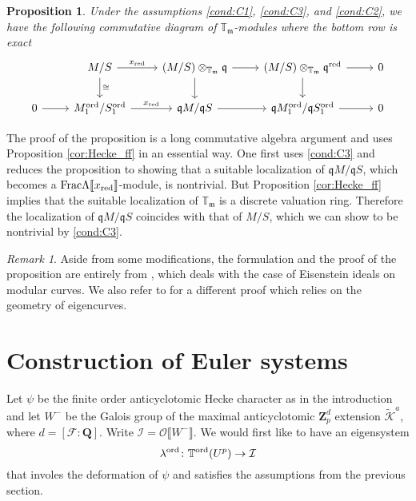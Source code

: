 \documentclass[leqno]{amsart}
\newtheorem{prop}[thm]{Proposition}
\theoremstyle{definition}
\theoremstyle{remark}
\newtheorem{rem}[thm]{Remark}
\newcommand{\oo}{\mathcal{O}}
\newcommand{\Q}{{\mathbf{Q}}}
\newcommand{\Zp}{\mathbf{Z}_p}
\newcommand{\fm}{\mathfrak{m}}
\newcommand{\fq}{\mathfrak{q}}
\newcommand{\red}{\textnormal{red}}
\newcommand{\xx}{x_\textnormal{red}}
\newcommand{\F}{{\mathcal{F}}} %
\newcommand{\K}{{\mathcal{K}}} %
\newcommand{\TT}{\mathbb{T}} %
\newcommand{\I}{\mathcal{I}} %
\newcommand{\ord}{\textnormal{ord}} %
\begin{document}
\begin{prop}\label{cor:fund}
	Under the assumptions
    \ref{cond:C1}, \ref{cond:C3}, and \ref{cond:C2},
    we have the following commutative diagram of $\TT_\fm$-modules
    where the bottom row is exact
    \begin{equation*}
    \begin{tikzcd}
    & M/S
    \arrow[r,"\xx"]\arrow[d,"\cong"] &
    (M/S)\otimes_{\TT_\fm}\fq
    \arrow[r]\arrow[d] &
    (M/S)\otimes_{\TT_\fm}\fq^\red
    \arrow[r]\arrow[d] &0\\
    0\arrow[r] &
    M^\ord_1/S^\ord_1
    \arrow[r,"\xx"] &
    \fq M/\fq S
    \arrow[r] &
    \fq M_1^{\ord}/\fq S_1^{\ord}
    \arrow[r] &0
    \end{tikzcd}
    \end{equation*}
\end{prop}

The proof of the proposition is a long commutative algebra argument
and uses Proposition \ref{cor:Hecke_ff} in an essential way.
One first uses \ref{cond:C3} and reduces the proposition 
to showing that a suitable localization of $\fq M/\fq S$,
which becomes a $\textnormal{Frac}\Lambda\llbracket\xx\rrbracket$-module,
is nontrivial.
But Proposition \ref{cor:Hecke_ff} implies that the suitable
localization of $\TT_\fm$ is a discrete valuation ring.
Therefore the localization of $\fq M/\fq S$ coincides with that 
of $M/S$, which we can show to be nontrivial by \ref{cond:C3}.


\begin{rem}
Aside from some modifications,
the formulation and the proof of the proposition
are entirely from \cite[Prop. 6.3.5]{urban},
which deals with the case of Eisenstein ideals on modular curves.
We also refer to \cite[Thm 3.4.1]{urban}
for a different proof 
which relies on the geometry of eigencurves.
\end{rem}


\section{Construction of Euler systems}

Let $\psi$ be the finite order anticyclotomic Hecke character
as in the introduction and let $W^-$ be the Galois group 
of the maximal anticyclotomic $\Zp^d$ extension 
$\tilde{\K}^a$, where $d=[\F:\Q]$.
Write $\I=\oo\llbracket W^-\rrbracket$. 
We would first like to have an eigensystem 
\[
\lambda^{\ord}\colon \TT^{\ord}(U^p)\to\I
\]
that involes the deformation of $\psi$ and
satisfies the assumptions from the previous section.
\end{document}
